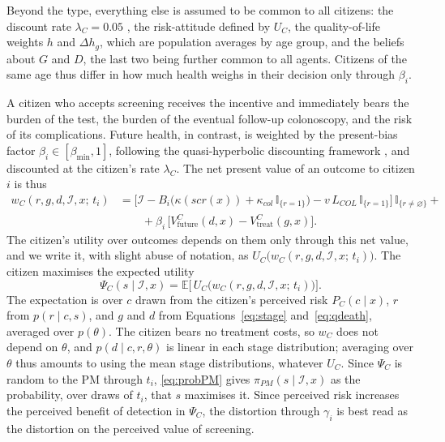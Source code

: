 \documentclass[12pt]{article}
\begin{document}
Beyond the type, everything else is assumed to be common to all citizens: the discount rate $\lambda_C = 0.05$ \citep{mahboub2014stated}, the risk-attitude defined by $U_C$, the quality-of-life weights $h$ and $\Delta h_g$, which are population averages by age group, and the beliefs about $G$ and $D$, the last two being further common to all agents. Citizens of the same age thus differ in how much health weighs in their decision only through $\beta_i$.

A citizen who accepts screening receives the incentive and immediately bears the burden of the test, the burden of the eventual follow-up colonoscopy, and the risk of its complications. Future health, in contrast, is weighted by the present-bias factor $\beta_i \in [\beta_{\min},1]$, following the quasi-hyperbolic discounting framework \citep{laibson1997golden}, and discounted at the citizen's rate $\lambda_C$. The net present value of an outcome to citizen $i$ is thus
\begin{align}\label{eq:wcit}
w_C(r,g,d,\mathcal{I},x;\, t_i) &=
  \Big[\mathcal{I} - B_i\big(\kappa(scr(x)) + \kappa_{col}\,\mathbb{I}_{\{r=1\}}\big) - v\,L_{COL}\,\mathbb{I}_{\{r=1\}}\Big]\,\mathbb{I}_{\{r\neq\varnothing\}}
  + \nonumber \\
  & \qquad + \beta_i\, \big[V^{C}_{\text{future}}(d,x) - V^{C}_{\text{treat}}(g,x)\big].
\end{align}
The citizen's utility over outcomes depends on them only through this net value, and we write it, with slight abuse of notation, as $U_C\big(w_C(r,g,d,\mathcal{I},x;\, t_i)\big)$. The citizen maximises the expected utility
\begin{equation}\label{eq:eucit}
\Psi_C(s \mid \mathcal{I}, x) = \mathbb{E}\big[\,U_C\big(w_C(r,g,d,\mathcal{I},x;\, t_i)\big)\big].
\end{equation}
The expectation is over $c$ drawn from the citizen's perceived risk $P_C(c \mid x)$, $r$ from $p(r \mid c, s)$, and $g$ and $d$ from Equations~\eqref{eq:stage} and~\eqref{eq:qdeath}, averaged over $p(\theta)$.
The citizen bears no treatment costs, so $w_C$ does not depend on $\theta$, and $p(d \mid c, r, \theta)$ is linear in each stage distribution; averaging over $\theta$ thus amounts to using the mean stage distributions, whatever $U_C$. Since $\Psi_C$ is random to the PM through $t_i$, \eqref{eq:probPM} gives $\pi_{PM}(s \mid \mathcal{I}, x)$ as the probability, over draws of $t_i$, that $s$ maximises it. Since perceived risk increases the perceived benefit of detection in $\Psi_C$, the distortion through $\gamma_i$ is best read as the distortion on the perceived value of screening.
\end{document}
